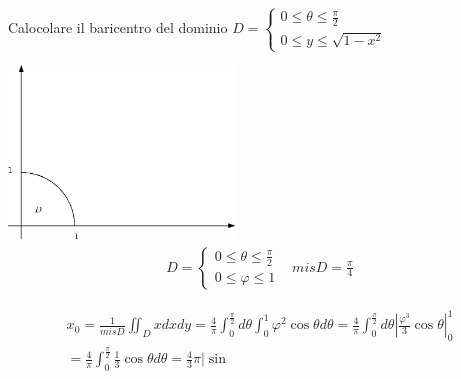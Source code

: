 \begin{esempio}
\begin{equation*}
\begin{matrix}
    \end{matrix}
  \end{equation*}
  \clearpage
   \begin{center}
            \fbox
            {
            \begin{minipage}{0.85\textwidth}
		Calocolare il baricentro del dominio $D=\begin{cases}
                                                          0\leq \theta \leq \frac{\pi}{2}\\
                                                          0\leq y \leq \sqrt{1-x^2}
                                                          \end{cases}$
              \begin{multicols}{2}
                \includegraphics[width=6cm]{img/finiti/baricentrodiundominionormale2.eps}\\
                \begin{equation*}
                  \begin{matrix}
                    D=\begin{cases}
                      0\leq \theta\leq\frac{\pi}{2}\\
                      0\leq \varphi\leq 1
                    \end{cases} & mis D=\frac{\pi}{4}
                  \end{matrix}
                \end{equation*}
              \end{multicols}
              \begin{equation*}
                \begin{matrix}
                  x_0= \frac{1}{mis D}\iint_D xdxdy=\frac{4}{\pi}
                  \int^{\frac{\pi}{2}}_0d\theta\int_0^1
                  \varphi^2\cos \theta d\theta = \frac{4}{\pi} \int_0^{\frac{\pi}{2}}d\theta \left|
                  \frac{\varphi^3}{3}\cos\theta\right|_0^1\\=\frac{4}{\pi}\int_0^{\frac{\pi}{2}}
                  \frac{1}{3} \cos \theta d\theta = \frac{4}{3}\pi \left|\sin

\end{matrix}
\end{equation*}
\end{minipage}}
\end{center}
\end{esempio}
